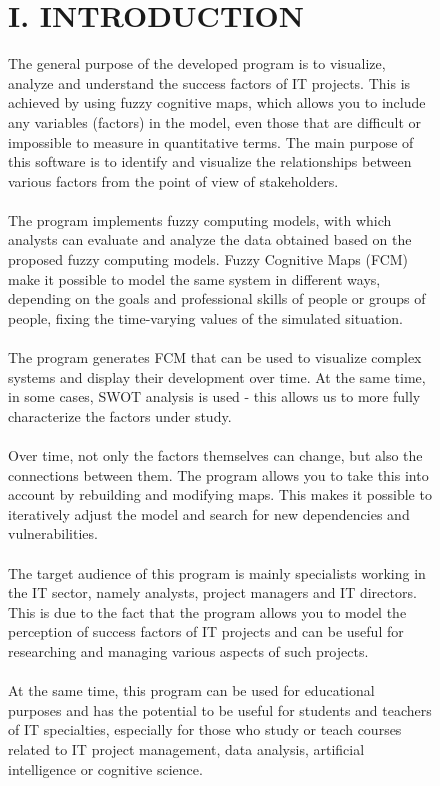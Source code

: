 \documentclass{article}
\begin{document}
\begin{figure}[!t]
\begin{minipage}{0.49\textwidth}
\begin{center}
                \chapter{I. INTRODUCTION}
            \end{center}
            The general purpose of the developed program is to visualize, analyze and understand the success factors of IT projects. This is achieved by using fuzzy cognitive maps, which allows you to include any variables (factors) in the model, even those that are difficult or impossible to measure in quantitative terms. The main purpose of this software is to identify and visualize the relationships between various factors from the point of view of stakeholders.\\
            ~\\
            The program implements fuzzy computing models, with which analysts can evaluate and analyze the data obtained based on the proposed fuzzy computing models. Fuzzy Cognitive Maps (FCM) make it possible to model the same system in different ways, depending on the goals and professional skills of people or groups of people, fixing the time-varying values of the simulated situation.\\
            ~\\
            The program generates FCM that can be used to visualize complex systems and display their development over time. At the same time, in some cases, SWOT analysis is used - this allows us to more fully characterize the factors under study.\\
            ~\\
            Over time, not only the factors themselves can change, but also the connections between them. The program allows you to take this into account by rebuilding and modifying maps. This makes it possible to iteratively adjust the model and search for new dependencies and vulnerabilities.\\
            ~\\
            The target audience of this program is mainly specialists working in the IT sector, namely analysts, project managers and IT directors. This is due to the fact that the program allows you to model the perception of success factors of IT projects and can be useful for researching and managing various aspects of such projects.\\
            ~\\
            At the same time, this program can be used for educational purposes and has the potential to be useful for students and teachers of IT specialties, especially for those who study or teach courses related to IT project management, data analysis, artificial intelligence or cognitive science.\\

\end{minipage}
\end{figure}
\end{document}
